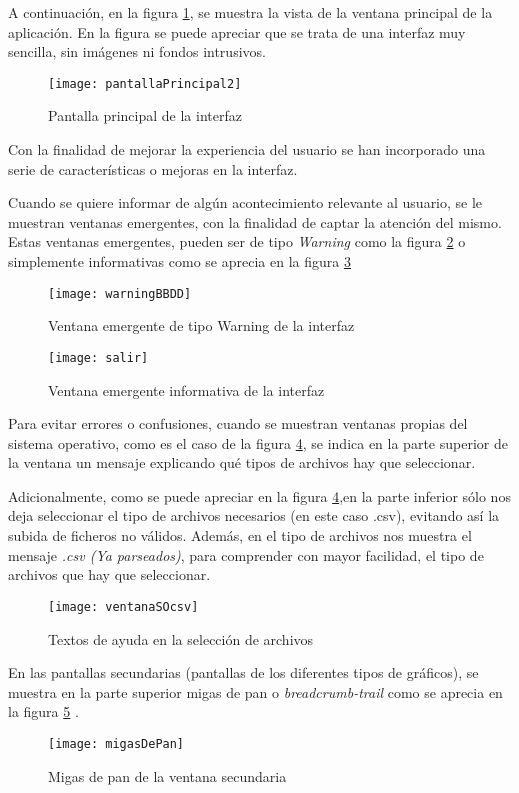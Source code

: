 A continuación, en la figura \ref{fig:pantallaPrincipal2}, se muestra la vista de la ventana principal de la aplicación. En la figura se puede apreciar que se trata de una interfaz muy sencilla, sin imágenes ni fondos intrusivos.

\begin{figure}%
		\centering
		\texttt{[image: pantallaPrincipal2]}
		\caption{Pantalla principal de la interfaz}\label{fig:pantallaPrincipal2}
	\end{figure}	

Con la finalidad de mejorar la experiencia del usuario se han incorporado una serie de características o mejoras en la interfaz.

Cuando se quiere informar de algún acontecimiento relevante al usuario, se le muestran ventanas emergentes, con la finalidad de captar la atención del mismo. 
Estas ventanas emergentes, pueden ser de tipo \emph{Warning} como la figura \ref{fig:warningBBDD} o simplemente informativas como se aprecia en la figura \ref{fig:salir}

\begin{figure}%
		\centering
		\texttt{[image: warningBBDD]}
		\caption{Ventana emergente de tipo Warning de la interfaz}\label{fig:warningBBDD}
	\end{figure}
	
\begin{figure}%
		\centering
		\texttt{[image: salir]}
		\caption{Ventana emergente informativa de la interfaz}\label{fig:salir}
	\end{figure}
	
Para evitar errores o confusiones, cuando se muestran ventanas propias del sistema operativo, como es el caso de la figura \ref{fig:ventanaSOcsv}, se indica en la parte superior de la ventana un mensaje explicando qué tipos de archivos hay que seleccionar.

Adicionalmente, como se puede apreciar en la figura \ref{fig:ventanaSOcsv},en la parte inferior sólo nos deja seleccionar el tipo de archivos necesarios (en este caso .csv), evitando así la subida de ficheros no válidos. Además, en el tipo de archivos nos muestra el mensaje \emph{.csv (Ya parseados)}, para comprender con mayor facilidad, el tipo de archivos que hay que seleccionar.
	
\begin{figure}%
		\centering
		\texttt{[image: ventanaSOcsv]}
		\caption{Textos de ayuda en la selección de archivos}\label{fig:ventanaSOcsv}
	\end{figure}
		
	
En las pantallas secundarias (pantallas de los diferentes tipos de gráficos), se muestra en la parte superior migas de pan o \emph{breadcrumb-trail} como se aprecia en la figura  \ref{fig:migasDePan} .

\begin{figure}%
		\centering
		\texttt{[image: migasDePan]}
		\caption{Migas de pan de la ventana secundaria}\label{fig:migasDePan}
	\end{figure}
	
	
	
